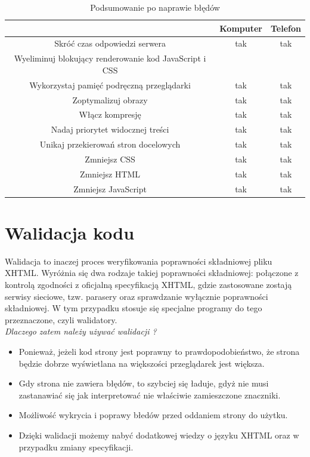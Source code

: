 \documentclass[openright]{xmgr}
\begin{document}
	\begin{table} [!h]
		\centering
		\begin{footnotesize}
			\caption{Podsumowanie po naprawie błędów}
			\begin{tabular}{|c|c|c|}
				\hline  & Komputer  & Telefon \\ 
				\hline  Skróć czas odpowiedzi serwera & tak & tak \\ 
				\hline  Wyeliminuj blokujący renderowanie kod JavaScript i CSS &  &  \\ 
				\hline Wykorzystaj pamięć podręczną przeglądarki & tak & tak \\ 
				\hline Zoptymalizuj obrazy & tak & tak \\ 
				\hline Włącz kompresję & tak & tak \\ 
				\hline Nadaj priorytet widocznej treści & tak & tak \\ 
				\hline Unikaj przekierowań stron docelowych & tak & tak \\ 
				\hline Zmniejsz CSS & tak & tak \\ 
				\hline Zmniejsz HTML & tak & tak \\ 
				\hline Zmniejsz JavaScript & tak & tak \\ 
				\hline 
			\end{tabular} 
		\end{footnotesize}
	\end{table}
	
	
	\chapter{Walidacja kodu}
	
	Walidacja to inaczej proces weryfikowania poprawności składniowej pliku XHTML. Wyróżnia się dwa rodzaje takiej poprawności składniowej: połączone z kontrolą zgodności z oficjalną specyfikacją XHTML, gdzie zastosowane zostają serwisy sieciowe, tzw. parasery oraz sprawdzanie wyłącznie poprawności składniowej. W tym przypadku stosuje się specjalne programy do tego przeznaczone, czyli walidatory.\\
	
	\textit{Dlaczego zatem należy używać walidacji ?}
		\begin{itemize}
			\item Ponieważ, jeżeli kod strony jest poprawny to prawdopodobieństwo, że strona będzie dobrze wyświetlana na większości przeglądarek jest większa.
			\item Gdy strona nie zawiera błędów, to szybciej się ładuje, gdyż nie musi zastanawiać się jak interpretować nie właściwie zamieszczone znaczniki.
			\item Możliwość wykrycia i poprawy błedów przed oddaniem strony do użytku.
			\item Dzięki walidacji możemy nabyć dodatkowej wiedzy o języku XHTML oraz w przypadku zmiany specyfikacji.
		\end{itemize}
		
\end{document}
